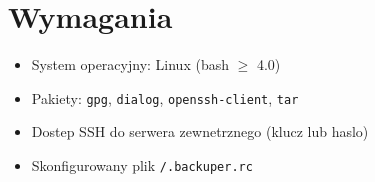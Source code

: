 \documentclass[a4paper,12pt]{article}
\begin{document}
\section{Wymagania}

\begin{itemize}[leftmargin=1.5em, itemsep=1pt, topsep=2pt]
  \item System operacyjny: Linux (bash $\geq$ 4.0)
  \item Pakiety: \texttt{gpg}, \texttt{dialog}, \texttt{openssh-client}, \texttt{tar}
  \item Dostep SSH do serwera zewnetrznego (klucz lub haslo)
  \item Skonfigurowany plik \texttt{/.backuper.rc}
\end{itemize}
\end{document}
